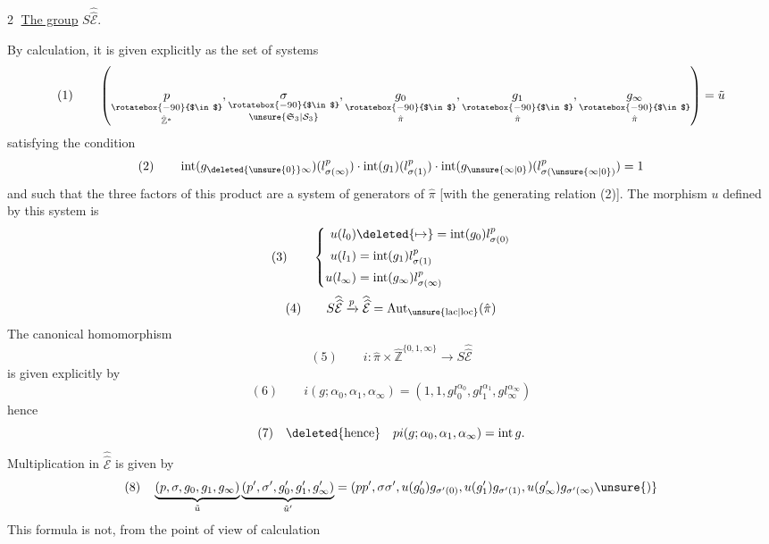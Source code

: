 \textcircled{2} \uline{The group} $S\widehat{\widehat{\mathcal E}}$.

By calculation, it is given explicitly as the set of systems
\[
(1)\qquad\left(\underset{\hat{\mathbb Z}^{*}}{\underset{\rotatebox{-90}{$\in$}}{p}},\underset{\unsure{\mathfrak S_3|\mathcal S_3}}{\underset{\rotatebox{-90}{$\in$}}{\sigma}},\underset{\hat\pi}{\underset{\rotatebox{-90}{$\in$}}{g_0}},\underset{\hat\pi}{\underset{\rotatebox{-90}{$\in$}}{g_1}},\underset{\hat\pi}{\underset{\rotatebox{-90}{$\in$}}{g_\infty}}\right)=\tilde u
\]
satisfying the condition
\[
(2)\qquad\operatorname{int}(g_{\deleted{\unsure{0}}\infty})(l_{\sigma(\infty)}^p)\cdot\operatorname{int}(g_1)(l_{\sigma(1)}^p)\cdot\operatorname{int}(g_{\unsure{\infty|0}})(l_{\sigma(\unsure{\infty|0})}^p)=1
\]
and such that the three factors of this product are a system of generators of $\hat\pi$ [with the generating relation (2)]. The morphism $u$ defined by this  system is
\[
(3)\qquad\left\{\begin{aligned}
u(l_0)&\deleted{\mapsto}=\operatorname{int}(g_0)l_{\sigma(0)}^p\\
u(l_1)&=\operatorname{int}(g_1)l_{\sigma(1)}^p\\
u(l_\infty)&=\operatorname{int}(g_\infty)l_{\sigma(\infty)}^p
\end{aligned}\right.
\]
\[
(4)\qquad S\widehat{\widehat{\mathcal E}}\xrightarrow{p}\widehat{\widehat{\mathcal E}}=\operatorname{Aut}_{\unsure{\mathrm{lac}|\mathrm{loc}}}(\hat\pi)
\]
The canonical homomorphism
\[
(5)\qquad i:\hat\pi\times\hat{\mathbb Z}^{\{0,1,\infty\}}\longrightarrow S\widehat{\widehat{\mathcal E}}
\]
is given explicitly by
\[
(6)\qquad i(g;\alpha_0,\alpha_1,\alpha_\infty)=(1,1,gl_0^{\alpha_0},gl_1^{\alpha_1},gl_\infty^{\alpha_\infty})
\]
hence
\[
(7)\quad\deleted{\text{hence}}\quad pi(g;\alpha_0,\alpha_1,\alpha_\infty)=\operatorname{int}g.
\]
Multiplication in $\widehat{\widehat{\mathcal E}}$ is given by
\[
(8)\quad\underbrace{(p,\sigma,g_0,g_1,g_\infty)}_{\tilde u}\underbrace{(p',\sigma',g'_0,g'_1,g'_\infty)}_{\tilde u'}=(pp',\sigma\sigma',u(g'_0)g_{\sigma'(0)},u(g'_1)g_{\sigma'(1)},u(g'_\infty)g_{\sigma'(\infty)}\unsure{)}
\]
This formula is not, from the point of view of calculation\unsure{,}
